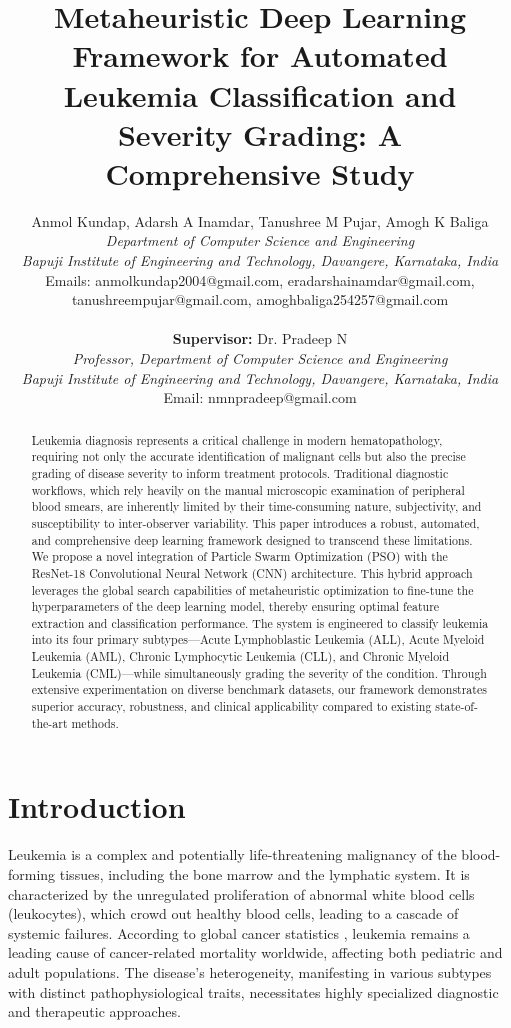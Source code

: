 \documentclass[12pt, a4paper]{article}
\title{Metaheuristic Deep Learning Framework for Automated Leukemia Classification and Severity Grading: A Comprehensive Study}
\author{
    Anmol Kundap, Adarsh A Inamdar, Tanushree M Pujar, Amogh K Baliga \\
    \textit{Department of Computer Science and Engineering} \\
    \textit{Bapuji Institute of Engineering and Technology, Davangere, Karnataka, India} \\
    Emails: anmolkundap2004@gmail.com, eradarshainamdar@gmail.com,\\
    tanushreempujar@gmail.com, amoghbaliga254257@gmail.com \\
    \\
    \textbf{Supervisor:} Dr. Pradeep N \\
    \textit{Professor, Department of Computer Science and Engineering} \\
    \textit{Bapuji Institute of Engineering and Technology, Davangere, Karnataka, India} \\
    Email: nmnpradeep@gmail.com
}
\date{}
\begin{document}
\maketitle

\begin{abstract}
Leukemia diagnosis represents a critical challenge in modern hematopathology, requiring not only the accurate identification of malignant cells but also the precise grading of disease severity to inform treatment protocols. Traditional diagnostic workflows, which rely heavily on the manual microscopic examination of peripheral blood smears, are inherently limited by their time-consuming nature, subjectivity, and susceptibility to inter-observer variability. This paper introduces a robust, automated, and comprehensive deep learning framework designed to transcend these limitations. We propose a novel integration of Particle Swarm Optimization (PSO) with the ResNet-18 Convolutional Neural Network (CNN) architecture. This hybrid approach leverages the global search capabilities of metaheuristic optimization to fine-tune the hyperparameters of the deep learning model, thereby ensuring optimal feature extraction and classification performance. The system is engineered to classify leukemia into its four primary subtypes—Acute Lymphoblastic Leukemia (ALL), Acute Myeloid Leukemia (AML), Chronic Lymphocytic Leukemia (CLL), and Chronic Myeloid Leukemia (CML)—while simultaneously grading the severity of the condition. Through extensive experimentation on diverse benchmark datasets, our framework demonstrates superior accuracy, robustness, and clinical applicability compared to existing state-of-the-art methods.
\end{abstract}

\section{Introduction}

Leukemia is a complex and potentially life-threatening malignancy of the blood-forming tissues, including the bone marrow and the lymphatic system. It is characterized by the unregulated proliferation of abnormal white blood cells (leukocytes), which crowd out healthy blood cells, leading to a cascade of systemic failures. According to global cancer statistics \cite{r1, r14}, leukemia remains a leading cause of cancer-related mortality worldwide, affecting both pediatric and adult populations. The disease's heterogeneity, manifesting in various subtypes with distinct pathophysiological traits, necessitates highly specialized diagnostic and therapeutic approaches.
\end{document}
